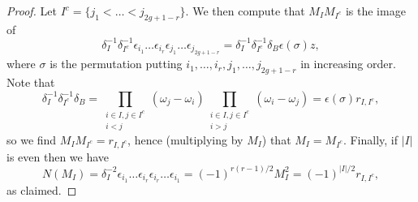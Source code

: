 \documentclass{article} %
\numberwithin{equation}{section}
\begin{document}
\begin{proof}
    Let $I^c = \{ j_1 < \dots < j_{2g+1-r} \}$. We then compute that $M_I M_{I^c}$ is the image of
    \[ \delta_I^{-1} \delta_{I^c}^{-1} \epsilon_{i_1} \dots \epsilon_{i_r} \epsilon_{j_1} \dots \epsilon_{j_{2g+1-r}} = \delta_I^{-1} \delta_{I^c}^{-1}\delta_B \epsilon(\sigma) z, \]
    where $\sigma$ is the permutation putting $i_1, \dots, i_r, j_1, \dots, j_{2g+1-r}$ in increasing order. Note that
    \[ \delta_I^{-1} \delta_{I^c}^{-1}\delta_B  = \prod_{\substack{ i \in I, j \in I^c \\ i < j}}(\omega_j - \omega_i) \prod_{\substack{ i \in I, j \in I^c \\ i > j}}(\omega_i - \omega_j) = \epsilon(\sigma) r_{I, I^c},
    \]
    so we find $M_I M_{I^c} = r_{I, I^c}$, hence (multiplying by $M_I$) that $M_I = M_{I^c}$. Finally, if $|I|$ is even then we have
    \[ N(M_I) = \delta_I^{-2} \epsilon_{i_1} \dots \epsilon_{i_r} \epsilon_{i_r} \dots \epsilon_{i_1} = (-1)^{r(r-1)/2} M_I^2 = (-1)^{|I|/2} r_{I, I^c},\]
     as claimed. 
    

\end{proof}
\end{document}
